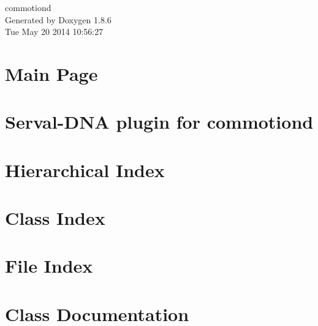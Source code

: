 \documentclass[twoside]{book}
\newcommand{\clearemptydoublepage}{%
  \newpage{\pagestyle{empty}\cleardoublepage}%
}
\begin{document}
\hypersetup{pageanchor=false}
\begin{titlepage}
\vspace*{7cm}
\begin{center}%
{\Large commotiond }\\
\vspace*{1cm}
{\large Generated by Doxygen 1.8.6}\\
\vspace*{0.5cm}
{\small Tue May 20 2014 10:56:27}\\
\end{center}
\end{titlepage}
\clearemptydoublepage
\tableofcontents
\clearemptydoublepage
{}
\hypersetup{pageanchor=true}

\chapter{Main Page}
\label{index}\hypertarget{index}{}
\chapter{Serval-\/\-D\-N\-A plugin for commotiond}
\label{md_plugins_serval-dna_README}
\hypertarget{md_plugins_serval-dna_README}{}

\chapter{Hierarchical Index}

\chapter{Class Index}

\chapter{File Index}

\chapter{Class Documentation}





































\end{document}
